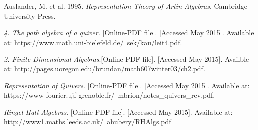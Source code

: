 \documentclass[11.5pt, twoside, a4paper, titlepage]{report}
\theoremstyle{definition}
\theoremstyle{plain}
\begin{document}
\begin{thebibliography}{99}
Auslander, M. et al.
1995.
\emph{Representation Theory of Artin Algebras}.
Cambridge University Press.

\emph{4. The path algebra of a quiver.}  [Online-PDF file].  [Accessed May 2015].
Available at: https://www.math.uni-bielefeld.de/~sek/kau/leit4.pdf.

\emph{2. Finite Dimensional Algebras}.[Online-PDF file]. [Accessed May 2015].
Availble at: http://pages.uoregon.edu/brundan/math607winter03/ch2.pdf.

\emph{Representation of Quivers}. [Online-PDF file]. [Accessed May 2015].
Available at: https://www-fourier.ujf-grenoble.fr/~mbrion/notes\_quivers\_rev.pdf.

\emph{Ringel-Hall Algebras}. [Online-PDF file]. [Accessed May 2015].
Available at: http://www1.maths.leeds.ac.uk/~ahubery/RHAlgs.pdf

\end{thebibliography}
\end{document}
